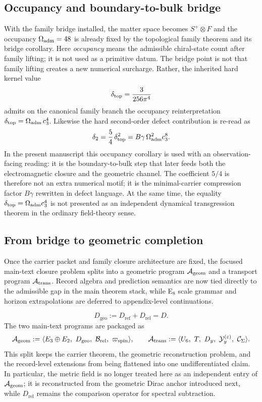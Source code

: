 \subsection{Occupancy and boundary-to-bulk bridge}

With the family bridge installed, the matter space becomes $S^+\otimes F$ and the occupancy $\Omega_{\mathrm{adm}}=48$ is already fixed by the topological family theorem and its bridge corollary. Here \emph{occupancy} means the admissible chiral-state count after family lifting; it is not used as a primitive datum. The bridge point is not that family lifting creates a new numerical surcharge. Rather, the inherited hard kernel value
\[
\delta_{\mathrm{top}}=\frac{3}{256\pi^4}
\]
admits on the canonical family branch the occupancy reinterpretation $\delta_{\mathrm{top}}=\Omega_{\mathrm{adm}}\,c_3^4$.
Likewise the hard second-order defect contribution is re-read as
\[
\delta_2=\frac54\,\delta_{\mathrm{top}}^2=B\gamma\,\Omega_{\mathrm{adm}}^2c_3^8.
\]
In the present manuscript this occupancy corollary is used with an observation-facing reading:
it is the boundary-to-bulk step that later feeds both the electromagnetic closure and the
geometric channel. The coefficient $5/4$ is therefore not an extra numerical motif; it is the
minimal-carrier compression factor $B\gamma$ rewritten in defect language. At the same time, the
equality $\delta_{\mathrm{top}}=\Omega_{\mathrm{adm}}c_3^4$ is not presented as an independent dynamical transgression
theorem in the ordinary field-theory sense.

\subsection{From bridge to geometric completion}

\begin{principle}
Once the carrier packet and family closure architecture are fixed, the focused main-text closure
problem splits into a geometric program $\mathcal A_{\mathrm{geom}}$ and a transport program $\mathcal A_{\mathrm{trans}}$. Record
algebra and prediction semantics are now tied directly to the admissible gap in the main theorem
stack, while E$_8$ scale grammar and horizon extrapolations are deferred to appendix-level
continuations.
\end{principle}

\[
D_{\mathrm{geo}}:=D_{\mathrm{ref}}+D_{\mathrm{rel}}=D.
\]
The two main-text programs are packaged as
\[
\Ageom
:=
\langle E_3\oplus E_2,\ D_{\mathrm{geo}},\ \mathcal B_{\mathrm{rel}},\ \wspin\rangle,
\qquad
\Atrans
:=
\langle U_6,\ T,\ D_y,\ \mathcal Y_y^{(\varepsilon)},\ \mathcal C_{\Seam}\rangle.
\]
This split keeps the carrier theorem, the geometric reconstruction problem, and the record-level extensions from being flattened into one undifferentiated claim. In particular, the metric field is no longer treated here as an independent entry of $\mathcal A_{\mathrm{geom}}$; it is reconstructed from the geometric Dirac anchor introduced next, while $D_{\mathrm{rel}}$ remains the comparison operator for spectral subtraction.

